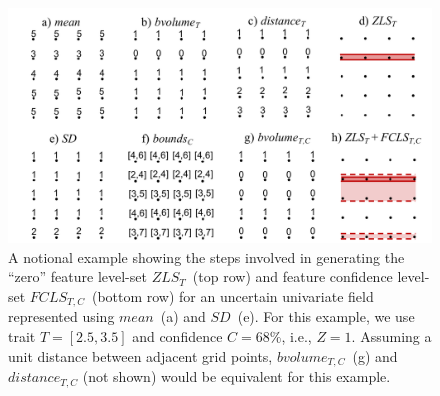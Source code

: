 \begin{figure}[!b]
\centering
\includegraphics[width=\linewidth, trim={1cm 0cm 0.5cm 0cm}, clip]{Images/example_narrow.pdf}
\caption{A notional example showing the steps involved in generating the ``zero'' feature level-set $ZLS_{T}$~(top row) and feature confidence level-set $FCLS_{T,C}$~(bottom row) for an uncertain univariate field represented using $mean$~(a) and $SD$~(e). 
%
For this example, we use trait $T=[2.5, 3.5]$ and confidence $C=68\%$, i.e., $Z=1$.
%
Assuming a unit distance between adjacent grid points,
%
$bvolume_{T,C}$~(g) and $distance_{T,C}$ (not shown) would be equivalent for this example.
}
\label{fig:example}
\end{figure}


